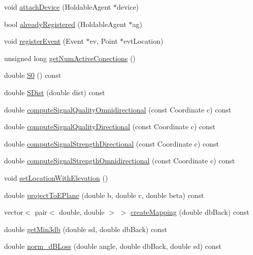 \begin{DoxyCompactItemize}
\item 
void \hyperlink{class_antenna_a9c804d991a545157feb066761b6a69ef}{attach\+Device} (Holdable\+Agent $\ast$device)
\item 
bool \hyperlink{class_antenna_af4fb83843393bf36bdcaefae5b5dd0dd}{already\+Registered} (Holdable\+Agent $\ast$ag)
\item 
void \hyperlink{class_antenna_aa931ec91c960c6d5704d4e25cf17229f}{register\+Event} (Event $\ast$ev, Point $\ast$evt\+Location)
\item 
unsigned long \hyperlink{class_antenna_a86c5c094ab6ea432609afa00f3a8080a}{get\+Num\+Active\+Conections} ()
\item 
double \hyperlink{class_antenna_a033246c50bec80123860154a949620c7}{S0} () const
\item 
double \hyperlink{class_antenna_ae60ab40ded94be407c3b7455f4e886fe}{S\+Dist} (double dist) const
\item 
double \hyperlink{class_antenna_a036e212fda08a9fc5215732378fc4fbd}{compute\+Signal\+Quality\+Omnidirectional} (const Coordinate c) const
\item 
double \hyperlink{class_antenna_a0bba3b0a586d5dc36397c2b9887cd42b}{compute\+Signal\+Quality\+Directional} (const Coordinate c) const
\item 
double \hyperlink{class_antenna_a38bb70c5ca249773512186c34792b43a}{compute\+Signal\+Strength\+Directional} (const Coordinate c) const
\item 
double \hyperlink{class_antenna_a26077f4061413733cedf9253ecc8686f}{compute\+Signal\+Strength\+Omnidirectional} (const Coordinate c) const
\item 
void \hyperlink{class_antenna_a4b1d0ae147826e553a044fd481d6c7e0}{set\+Location\+With\+Elevation} ()
\item 
double \hyperlink{class_antenna_a298c80a54828c8f13d584e8e382145a5}{project\+To\+E\+Plane} (double b, double c, double beta) const
\item 
vector$<$ pair$<$ double, double $>$ $>$ \hyperlink{class_antenna_afe86e36673d4b28713f983cc63d89e1b}{create\+Mapping} (double db\+Back) const
\item 
double \hyperlink{class_antenna_a1c6126c232ee496b9b693fc20e4892f5}{get\+Min3db} (double sd, double db\+Back) const
\item 
double \hyperlink{class_antenna_a8270b1a03b61af1e048650e00a129b93}{norm\+\_\+d\+B\+Loss} (double angle, double db\+Back, double sd) const
\item 

\end{DoxyCompactItemize}
